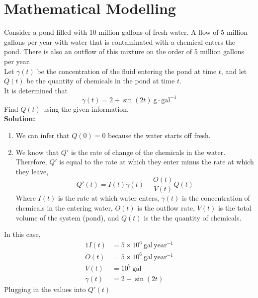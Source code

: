 \documentclass[diffeq.tex]{subfiles}
\begin{document}
    \section{Mathematical Modelling}
    \begin{example}[Modelling]
        \label{ex4-2}
        Consider a pond filled with 10 million gallons of fresh water. A flow of 5 million gallons per year with water that is contaminated with a chemical enters the pond. There is also an outflow of this mixture on the order of 5 million gallons per year.\\[1em]
        Let $\gamma(t)$ be the concentration of the fluid entering the pond at time $t$, and let $Q(t)$ be the quantity of chemicals in the pond at time $t$.\\[1em]
        It is determined that
        \begin{equation}
            \gamma(t) = 2 + \sin(2t)\ \text{g}\cdot\text{gal}^{-1}
        \end{equation}
        Find $Q(t)$ using the given information.\\[1em]
        \textbf{Solution:}
        \begin{enumerate}
            \item We can infer that $Q(0) = 0$ because the water starts off fresh.
            \item We know that $Q'$ is the rate of change of the chemicals in the water. Therefore, $Q'$ is equal to the rate at which they enter minus the rate at which they leave,
            \begin{equation}
                Q'(t) = I(t)\gamma(t) - \frac{O(t)}{V(t)}Q(t)
            \end{equation}
            Where $I(t)$ is the rate at which water enters, $\gamma(t)$ is the concentration of chemicals in the entering water, $O(t)$ is the outflow rate, $V(t)$ is the total volume of the system (pond), and $Q(t)$ is the the quantity of chemicals.
        \end{enumerate}
        In this case,
        \begin{alignat}{1}
            I(t) &= 5\times 10^{6}\ \text{gal}\,\text{year}^{-1}\\
            O(t) &= 5\times 10^{6}\ \text{gal}\,\text{year}^{-1}\\
            V(t) &= 10^{7}\ \text{gal}\\
            \gamma(t) &= 2 + \sin(2t)
        \end{alignat}
        Plugging in the values into $Q'(t)$

\end{example}
\end{document}
